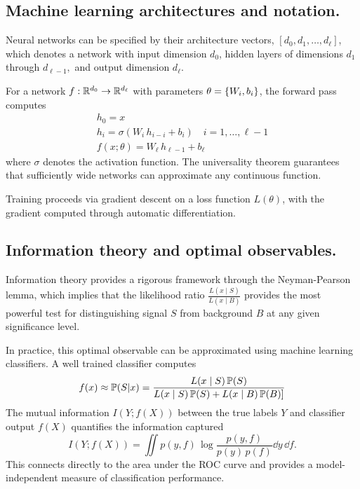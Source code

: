     \subsection{Machine learning architectures and notation.}
        Neural networks can be specified by their architecture vectors, \( [d_0, d_1,\dots, d_\ell]\), which denotes a network with input dimension \(d_0\), hidden layers of dimensions \(d_1\) through \(d_{\ell-1},\) and output dimension \(d_\ell\).

        For a network \(f: \R^{d_0} \to\R^{d_{\ell}}\) with parameters \(\theta = \qty{W_i, b_i}\), the forward pass computes
        \begin{gather}
            h_0 = x\\
            h_i = \sigma(W_i\,h_{i-i} + b_i)\quad i = 1,\dots, \ell-1\\
            f(x;\theta) = W_\ell\,h_{\ell - 1} + b_\ell
        \end{gather}
        where \(\sigma\) denotes the activation function. The universality theorem guarantees that sufficiently wide networks can approximate any continuous function.

        Training proceeds via gradient descent on a loss function \(L(\theta)\), with the gradient computed through automatic differentiation.
        
    \subsection{Information theory and optimal observables.}
        Information theory provides a rigorous framework through the Neyman-Pearson lemma, which implies that the likelihood ratio \(\frac{L(x\mid S)}{L(x\mid B)}\) provides the most powerful test for distinguishing signal \(S\) from background \(B\) at any given significance level.

        In practice, this optimal observable can be approximated using machine learning classifiers.
        A well trained classifier computes
        \[
            f(x) \approx \P(S|x) = \frac{L(x\mid S)\,\P(S)}{L(x\mid S)\,\P(S) + L(x\mid B)\, \P(B)]}
        \]
        The mutual information \(I(Y; f(X))\) between the true labels \(Y\) and classifier output \(f(X)\) quantifies the information captured
        \[
            I(Y; f(X)) = \iint p(y, f)\,\log \frac{p(y, f)}{p(y)\,p(f)} \dd y\, \dd f.
        \]
        This connects directly to the area under the ROC curve and provides a model-independent measure of classification performance.

